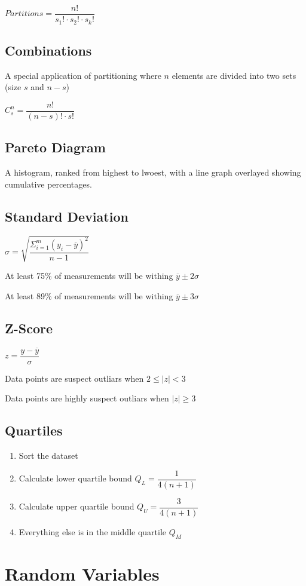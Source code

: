 \documentclass{hitec}
\begin{document}
$Partitions = \dfrac{n!}{s_1!\cdot s_2!\cdot s_k!}$

\subsection*{Combinations}
A special application of partitioning where $n$ elements are divided into two sets (size $s$ and $n-s$)

$C^n_s = \dfrac{n!}{(n-s)!\cdot s!}$
\subsection*{Pareto Diagram}
A histogram, ranked from highest to lwoest, with a line graph overlayed showing cumulative percentages.

\subsection*{Standard Deviation}
$\sigma = \sqrt{\dfrac{\Sigma^m_{i=1}(y_i - \overline{y})^2}{n-1}}$

At least 75\% of measurements will be withing $\overline{y}\pm 2\sigma$

At least 89\% of measurements will be withing $\overline{y}\pm 3\sigma$

\subsection*{Z-Score}
$z = \dfrac{y-\overline{y}}{\sigma}$

Data points are suspect outliars when $2\le |z| < 3$

Data points are highly suspect outliars when $|z| \ge 3$

\subsection*{Quartiles}
\begin{enumerate}
	\item Sort the dataset
	\item Calculate lower quartile bound $Q_L = \dfrac{1}{4(n+1)}$
	\item Calculate upper quartile bound $Q_U = \dfrac{3}{4(n+1)}$
	\item Everything else is in the middle quartile $Q_M$
\end{enumerate}

\section*{Random Variables}
\end{document}
